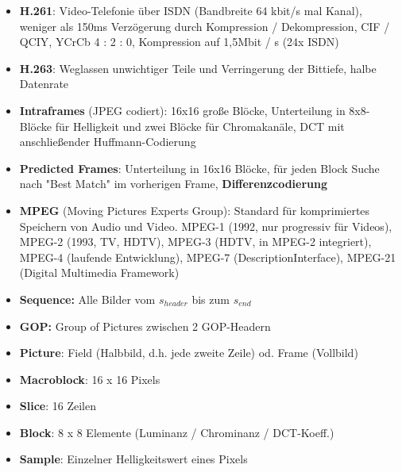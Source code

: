\documentclass[12pt,landscape]{article}
\begin{document}
\begin{multicols}{3}
\begin{itemize}
\item \textbf{H.261}: Video-Telefonie über ISDN (Bandbreite 64 kbit/s mal Kanal), weniger als 150ms Verzögerung durch Kompression / Dekompression, CIF / QCIY, YCrCb 4 : 2 : 0, Kompression auf 1,5Mbit / s (24x ISDN)
\item \textbf{H.263}: Weglassen unwichtiger Teile und Verringerung der Bittiefe, halbe Datenrate
\item \textbf{Intraframes} (JPEG codiert): 16x16 große Blöcke, Unterteilung in 8x8-Blöcke für Helligkeit und zwei Blöcke für Chromakanäle, DCT mit anschließender Huffmann-Codierung
\item \textbf{Predicted Frames}: Unterteilung in 16x16 Blöcke, für jeden Block Suche nach "Best Match" im vorherigen Frame, \textbf{Differenzcodierung}
\item \textbf{MPEG} (Moving Pictures Experts Group): Standard für komprimiertes Speichern von Audio und Video. MPEG-1 (1992, nur progressiv für Videos), MPEG-2 (1993, TV, HDTV), MPEG-3 (HDTV, in MPEG-2 integriert), MPEG-4 (laufende Entwicklung), MPEG-7 (DescriptionInterface), MPEG-21 (Digital Multimedia Framework)
\item \textbf{Sequence:} Alle Bilder vom $s_{header}$ bis zum $s_{end}$
\item \textbf{GOP:} Group of Pictures zwischen 2 GOP-Headern
\item \textbf{Picture}: Field (Halbbild, d.h. jede zweite Zeile) od. Frame (Vollbild)
\item \textbf{Macroblock}: 16 x 16 Pixels
\item \textbf{Slice}: 16 Zeilen
\item \textbf{Block}: 8 x 8 Elemente (Luminanz / Chrominanz / DCT-Koeff.)
\item \textbf{Sample}: Einzelner Helligkeitswert eines Pixels

\end{itemize}
\end{multicols}
\end{document}
